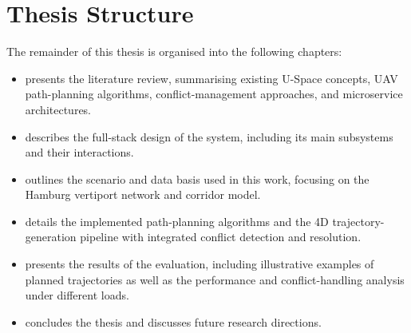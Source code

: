 \section{Thesis Structure}%
\label{s_structure}

The remainder of this thesis is organised into the following chapters:

\begin{itemize}
  \item {} presents the literature review, summarising existing U-Space concepts, UAV path-planning algorithms, conflict-management approaches, and microservice architectures.
  \item {} describes the full-stack design of the system, including its main subsystems and their interactions.
  \item {} outlines the scenario and data basis used in this work, focusing on the Hamburg vertiport network and corridor model.
  \item {} details the implemented path-planning algorithms and the 4D trajectory-generation pipeline with integrated conflict detection and resolution.
  \item {} presents the results of the evaluation, including illustrative examples of planned trajectories as well as the performance and conflict-handling analysis under different loads.
  \item {} concludes the thesis and discusses future research directions.
\end{itemize}
